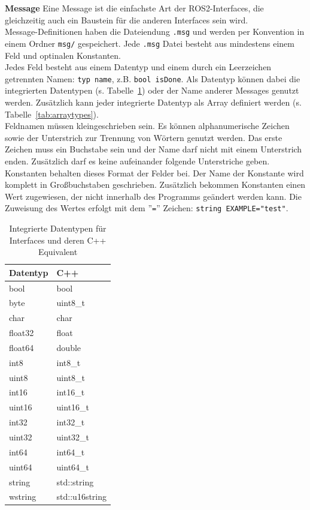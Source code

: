 \textbf{Message} Eine Message ist die einfachste Art der \ac{ROS2}-Interfaces, die gleichzeitig auch ein Baustein für die anderen Interfaces sein wird.\\
Message-Definitionen haben die Dateiendung \verb|.msg| und werden per Konvention in einem Ordner \verb|msg/| gespeichert.
Jede \verb|.msg| Datei besteht aus mindestens einem Feld und optinalen Konstanten.\\
Jedes Feld besteht aus einem Datentyp und einem durch ein Leerzeichen getrennten Namen: \verb|typ name|, z.B. \verb|bool isDone|.
Als Datentyp können dabei die integrierten Datentypen (s. Tabelle~\ref{tab:builtintypes}) oder der Name anderer Messages genutzt werden.
Zusätzlich kann jeder integrierte Datentyp als Array definiert werden (s. Tabelle~\ref{tab:arraytypes}).\\
Feldnamen müssen kleingeschrieben sein.
Es können alphanumerische Zeichen sowie der Unterstrich zur Trennung von Wörtern genutzt werden.
Das erste Zeichen muss ein Buchstabe sein und der Name darf nicht mit einem Unterstrich enden.
Zusätzlich darf es keine aufeinander folgende Unterstriche geben.\\
Konstanten behalten dieses Format der Felder bei.
Der Name der Konstante wird komplett in Großbuchstaben geschrieben.
Zusätzlich bekommen Konstanten einen Wert zugewiesen, der nicht innerhalb des Programms geändert werden kann.
Die Zuweisung des Wertes erfolgt mit dem ''\verb|=|'' Zeichen: \verb|string EXAMPLE="test"|.
\begin{table}[ht]
    \centering
    \caption{Integrierte Datentypen für Interfaces und deren C++ Equivalent}
\begin{tabular}{|l|l|}
\hline
\textbf{Datentyp} & \textbf{C++}   \\ \hline
bool         & bool           \\ \hline
byte         & uint8\_t       \\ \hline
char         & char           \\ \hline
float32      & float          \\ \hline
float64      & double         \\ \hline
int8         & int8\_t        \\ \hline
uint8        & uint8\_t       \\ \hline
int16        & int16\_t       \\ \hline
uint16       & uint16\_t      \\ \hline
int32        & int32\_t       \\ \hline
uint32       & uint32\_t      \\ \hline
int64        & int64\_t       \\ \hline
uint64       & uint64\_t      \\ \hline
string       & std::string    \\ \hline
wstring      & std::u16string \\ \hline
\end{tabular}
    \label{tab:builtintypes}
\end{table}
